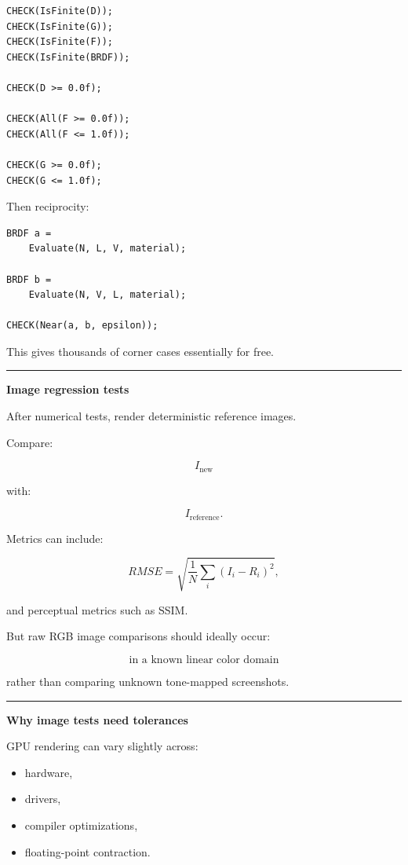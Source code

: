 \begin{verbatim}
CHECK(IsFinite(D));
CHECK(IsFinite(G));
CHECK(IsFinite(F));
CHECK(IsFinite(BRDF));

CHECK(D >= 0.0f);

CHECK(All(F >= 0.0f));
CHECK(All(F <= 1.0f));

CHECK(G >= 0.0f);
CHECK(G <= 1.0f);
\end{verbatim}

Then reciprocity:

\begin{verbatim}
BRDF a =
    Evaluate(N, L, V, material);

BRDF b =
    Evaluate(N, V, L, material);

CHECK(Near(a, b, epsilon));
\end{verbatim}

This gives thousands of corner cases essentially for free.

\begin{center}\rule{0.5\linewidth}{0.5pt}\end{center}

\textbf{Image regression tests}

After numerical tests, render deterministic reference images.

Compare:

\[
I_{\text{new}}
\]

with:

\[
I_{\text{reference}}.
\]

Metrics can include:

\[
RMSE
=
\sqrt{
\frac1N
\sum_i
(I_i-R_i)^2
},
\]

and perceptual metrics such as SSIM.

But raw RGB image comparisons should ideally occur:

\[
\boxed{
\text{in a known linear color domain}
}
\]

rather than comparing unknown tone-mapped screenshots.

\begin{center}\rule{0.5\linewidth}{0.5pt}\end{center}

\textbf{Why image tests need tolerances}

GPU rendering can vary slightly across:

\begin{itemize}
\tightlist
\item
  hardware,
\item
  drivers,
\item
  compiler optimizations,
\item
  floating-point contraction.
\end{itemize}

